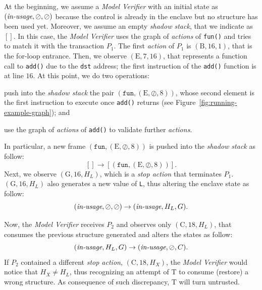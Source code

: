 At the beginning, we assume a \emph{Model Verifier} with an initial state as 
$(\emph{in-usage}, \oslash, \oslash)$ because the control is already in the 
enclave but no structure has been used yet.
Moreover, we assume an empty \emph{shadow stack}, that we indicate as $[]$.
In this case, the \emph{Model Verifier} uses the graph of \emph{actions} of 
\texttt{fun()} and tries to match it with the transaction $P_1$.
The first \emph{action} of $P_1$ is $(\text{B}, 16, 1)$, that is the 
for-loop entrance.
Then, we observe $(\text{E}, 7, 16)$, that represents a function call to 
\texttt{add()} due to the \texttt{dst} address; 
\ie the first instruction of the \texttt{add()} function is at line $16$.
At this point, we do two operations:
\begin{enumerate*}[label=(\roman*)]
	\item push into the \emph{shadow stack} the pair $(\texttt{fun}, (\text{E}, 
	\oslash, 8))$, whose second element is the first instruction to execute 
	once \texttt{add()} returns (see Figure~\ref{fig:running-example-graph}); 
	and 
	\item use the graph of \emph{actions} of \texttt{add()} to validate further 
	\emph{actions}.
\end{enumerate*}
In particular, a new frame $(\texttt{fun}, (\text{E}, \oslash, 8))$ is pushed 
into the \emph{shadow stack} as follow:
$$
[] \rightarrow [(\texttt{fun}, (\text{E}, \oslash, 8))].
$$
Next, we observe $(\text{G}, 16, H_L)$, which is a \emph{stop action} that 
terminates $P_1$.
$(\text{G}, 16, H_L)$ also generates a new value of \texttt{L}, thus altering 
the enclave state as follow:
$$
(\emph{in-usage}, \oslash, \oslash) \rightarrow (\emph{in-usage}, H_L, G).
$$

Now, the \emph{Model Verifier} receives $P_2$ and observes only $(\text{C}, 18, 
H_L)$, that consumes the previous structure generated and alters the states as 
follow:
$$
(\emph{in-usage}, H_L, G) \rightarrow (\emph{in-usage}, \oslash, C).
$$
If $P_2$ contained a different \emph{stop action}, \eg $(\text{C}, 18, H_X)$, 
the \emph{Model Verifier} would notice that $H_X \neq H_L$, thus recognizing 
an attempt of T to consume (\ie restore) a wrong structure. As consequence 
of such discrepancy, T will turn untrusted.

